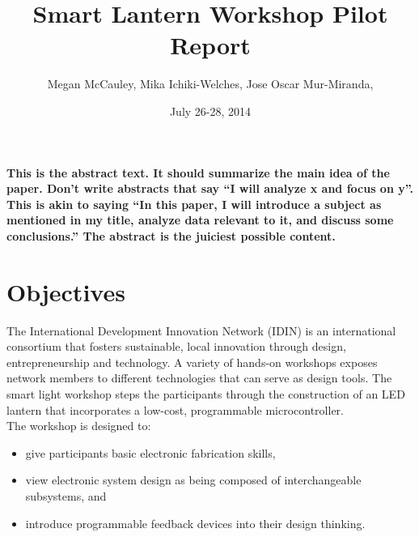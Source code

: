 \documentclass[11pt, twocolumn]{article}
\title{Smart Lantern Workshop Pilot Report} %
\author{Megan McCauley, Mika Ichiki-Welches, Jose Oscar Mur-Miranda, } %
\date{July 26-28, 2014} %
\begin{document}
\maketitle %

\thispagestyle{fancy} %


\noindent \textbf{This is the abstract text. It should summarize the main idea of the paper. Don't write abstracts that say ``I will analyze x and focus on y''. This is akin to saying ``In this paper, I will introduce a subject as mentioned in my title, analyze data relevant to it, and discuss some conclusions.'' The abstract is the juiciest possible content.}

\section*{Objectives}
The International Development Innovation Network (IDIN) is an international consortium that fosters sustainable, local innovation through design, entrepreneurship and technology. A variety of hands-on workshops exposes network members to different technologies that can serve as design tools. The smart light workshop steps the participants through the construction of an LED lantern that incorporates a low-cost, programmable microcontroller.\ \\
The workshop is designed to:
\begin{itemize}
\item give participants basic electronic fabrication skills,
\item view electronic system design as being composed of interchangeable subsystems, and
\item introduce programmable feedback devices into their design thinking.
\end{itemize}
\end{document}
